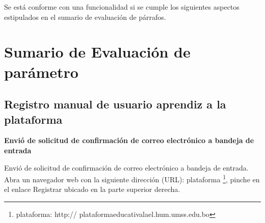 Se est\'{a} conforme con una funcionalidad si se cumple los siguientes aspectos
estipulados en el sumario de evaluaci\'{o}n de p\'{a}rrafos.

\section{Sumario de Evaluaci\'{o}n de par\'{a}metro}

\subsection{Registro manual de usuario aprendiz a la plataforma}

\textbf{Envi\'{o} de solicitud de confirmaci\'{o}n de correo electr\'{o}nico a
bandeja de entrada}

Envi\'{o} de solicitud de confirmaci\'{o}n de correo electr\'{o}nico a bandeja
de entrada. Abra un navegador web con la siguiente direcci\'{o}n (URL): plataforma
\footnote{plataforma: http:// plataformaeducativalael.hum.umss.edu.bo}, pinche en 
el enlace Registrar ubicado en la parte superior derecha.

